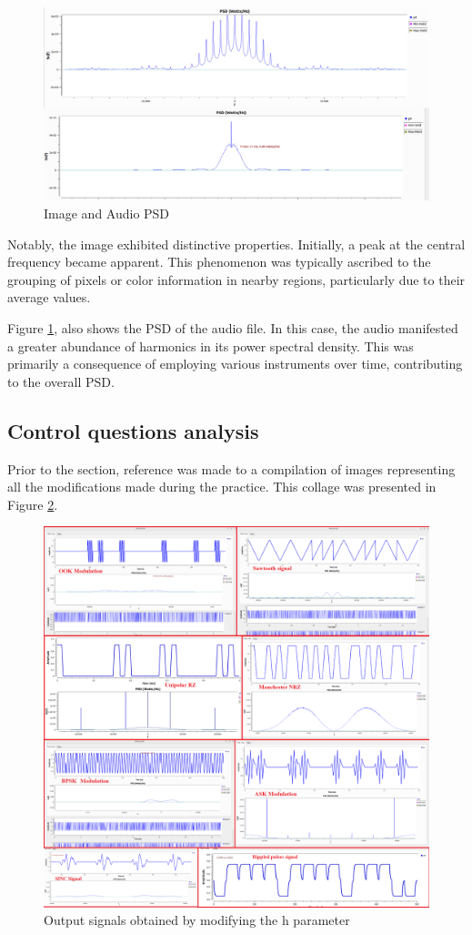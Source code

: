 \documentclass{journal}[IEEEtran, twocolumn]             %
\begin{document}
\begin{multicols}{2}
\begin{figure}[H]
    \centering
        \centering
        \includegraphics[width=0.65\columnwidth]{figs/im_aud.png}
    \caption{Image and Audio PSD}
    \label{fig:figF}
\end{figure}

Notably, the image exhibited distinctive properties. Initially, a peak at the central frequency became apparent. This phenomenon was typically ascribed to the grouping of pixels or color information in nearby regions, particularly due to their average values.

Figure \ref{fig:figF}, also shows the PSD of the audio file.
In this case, the audio manifested a greater abundance of harmonics in its power spectral density. This was primarily a consequence of employing various instruments over time, contributing to the overall PSD.

\subsection{Control questions analysis}

Prior to the section, reference was made to a compilation of images representing all the modifications made during the practice. This collage was presented in Figure \ref{fig:figTRANS}.

\begin{figure}[H]
    \centering
        \centering
        \includegraphics[width=0.7\columnwidth]{figs/Transfor.png}
    \caption{Output signals obtained by modifying the h parameter}
    \label{fig:figTRANS}
\end{figure}


\end{multicols}
\end{document}

